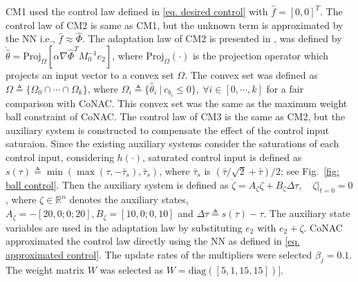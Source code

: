 \documentclass[lettersize,journal]{IEEEtran}
\begin{document}
CM1 used the control law defined in \eqref{eq. desired control} with $\hat f=[0,0]^T$.
The control law of CM2 is same as CM1, but the unknown term is approximated by the NN i.e., $\hat f\approx \hat\Phi$.
The adaptation law of CM2 is presented in \cite{RN16}, was defined by $\dot {\hat\theta}= \text{Proj}_{\Omega}[\alpha  \nabla\hat\Phi^TM_0^{-1}e_2]$, where $\text{Proj}_{\Omega}(\cdot)$ is the projection operator \cite[Appendix E, eq.~(E.4)]{RN20} which projects an input vector to a convex set $\Omega$. The convex set was defined as ${\Omega}\triangleq \{\Omega_0 \cap\cdots\cap \Omega_k\}$, where $\Omega_i\triangleq \{\hat\theta_i\ \vert \ c_{b_i}\le 0\}, \ \forall i\in[0,\cdots, k]$ for a fair comparison with CoNAC. This convex set was the same as the maximum weight ball constraint of CoNAC.
The control law of CM3 is the same as CM2, but the auxiliary system is constructed to compensate the effect of the control input saturaion.
Since the existing auxiliary systems consider the saturations of each control input, considering $h(\cdot)$, saturated control input is defined as $s(\tau)\triangleq \min(\max(\tau,-\bar\tau_s),\bar\tau_s)$, where $\bar\tau_s$ is $(\bar\tau/\sqrt{2}+\bar\tau)/2$; see Fig.~\ref{fig: ball control}.
Then the auxiliary system is defined as $\dot\zeta = A_\zeta \zeta + B_\zeta \Delta\tau,\quad \zeta\vert_{t=0} = 0$, where $\zeta\in\mathbb{R}^n$ denotes the auxiliary states, $A_\zeta=-[20,0;0;20],B_\zeta=[10,0;0,10]$ and $\Delta\tau\triangleq s(\tau)-\tau$.
The auxiliary state variables are used in the adaptation law by substituting $e_2$ with $e_2+\zeta$.
CoNAC approximated the control law directly using the NN as defined in \eqref{eq. approximated control}.
The update rates of the multipliers were selected $\beta_{j}=0.1$.
The weight matrix $W$ was selected as $W=\text{diag}([5,1,15,15])]$.
\end{document}
